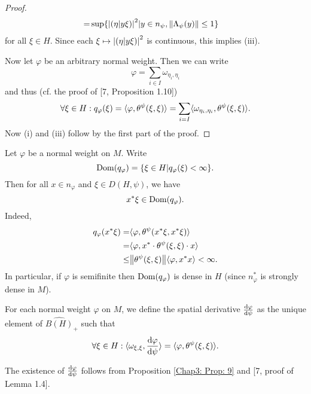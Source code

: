 \begin{proof}
\[\begin{split}
            =&\sup\{\abs{(\eta|y\xi)}^2|y\in n_\psi,\norm{\Lambda_\psi(y)}\leq 1\}
        \end{split}
    \]
    for all $\xi\in H$. Since each $\xi\mapsto \abs{(\eta|y\xi)}^2$ is continuous, this implies (iii).\par
    Now let $\varphi$ be an arbitrary normal weight. Then we can write
    \[
        \varphi=\sum_{i\in I}\omega_{\eta_i,\eta_i}
    \]
    and thus (cf. the proof of [7, Proposition 1.10])
    \[
        \forall \xi\in H:  q_\varphi(\xi)=\langle\varphi,\theta^\psi(\xi,\xi)\rangle=\sum_{i=I}\langle\omega_{\eta_i,\eta_i},\theta^\psi(\xi,\xi)\rangle.
    \]
    Now (i) and (iii) follow by the first part of the proof.
\end{proof}
\begin{remark}
    Let $\varphi$ be a normal weight on $M$. Write
    \begin{equation}
        \operatorname{Dom}(q_\varphi)=\{\xi\in H|q_\varphi(\xi)<\infty\}.
    \end{equation}
    Then for all $x\in n_\varphi$ and $\xi\in D(H,\psi)$, we have
    \begin{equation}
        x^*\xi\in \operatorname{Dom}(q_\varphi).
    \end{equation}
    Indeed,
    \[
        \begin{split}
            q_\varphi(x^*\xi)=&\langle\varphi,\theta^\psi(x^*\xi,x^*\xi)\rangle\\
            =&\langle\varphi,x^*\cdot\theta^\psi(\xi,\xi)\cdot x\rangle\\
            \leq &\norm{\theta^\psi(\xi,\xi)}\langle\varphi,x^*x\rangle<\infty.
        \end{split}
    \]
    In particular, if $\varphi$ is semifinite then $\operatorname{Dom}(q_\varphi)$ is dense in $H$ (since $n_\varphi^*$ is strongly dense in $M$).
\end{remark}
\begin{definition}\label{Chap3: Def: 11}
    For each normal weight $\varphi$ on $M$, we define the spatial derivative $\dv{\varphi}{\psi}$ as the unique element of $\widehat{B(H)}_+$ such that
    \begin{equation}\label{Chap3: Eqn: 9}
        \forall \xi\in H: \langle\omega_{\xi,\xi},\dv{\varphi}{\psi}\rangle=\langle\varphi,\theta^\psi(\xi,\xi)\rangle.
    \end{equation}
\end{definition}
The existence of $\dv{\varphi}{\psi}$ follows from Proposition \ref{Chap3: Prop: 9} and [7, proof of Lemma 1.4].
